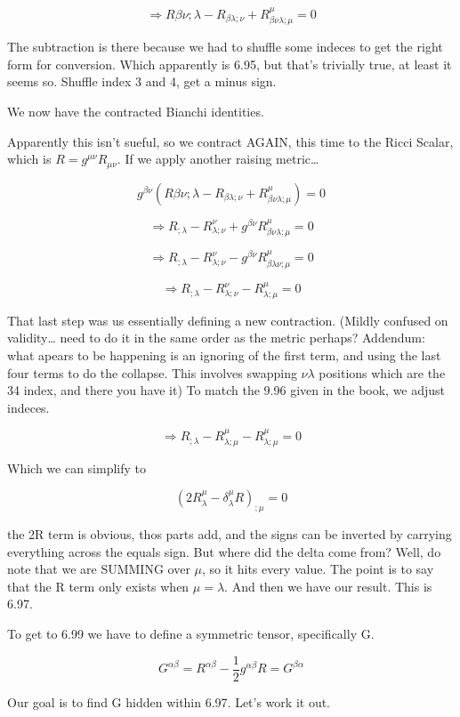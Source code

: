 \documentclass[landscape,letterpaper,10pt,english]{article}
\begin{document}
\[\Rightarrow R{\beta\nu;\lambda} - R_{\beta\lambda;\nu} + R^\mu_{\beta\nu\lambda;\mu} = 0\]

The subtraction is there because we had to shuffle some indeces to get
the right form for conversion. Which apparently is 6.95, but that's
trivially true, at least it seems so. Shuffle index 3 and 4, get a minus
sign.

We now have the contracted Bianchi identities.

Apparently this isn't sueful, so we contract AGAIN, this time to the
Ricci Scalar, which is \(R = g^{\mu\nu}R_{\mu\nu}\). If we apply another
raising metric\ldots{}

\[g^{\beta\nu} (R{\beta\nu;\lambda} - R_{\beta\lambda;\nu} + R^\mu_{\beta\nu\lambda;\mu}) = 0\]

\[\Rightarrow R_{;\lambda} - R^\nu_{\lambda;\nu} + g^{\beta\nu}R^\mu_{\beta\nu\lambda;\mu} = 0\]

\[\Rightarrow R_{;\lambda} - R^\nu_{\lambda;\nu} - g^{\beta\nu}R^\mu_{\beta\lambda\nu;\mu} = 0\]

\[\Rightarrow R_{;\lambda} - R^\nu_{\lambda;\nu} - R^{\mu}_{\lambda;\mu} = 0\]

That last step was us essentially defining a new contraction. (Mildly
confused on validity\ldots{} need to do it in the same order as the
metric perhaps? Addendum: what apears to be happening is an ignoring of
the first term, and using the last four terms to do the collapse. This
involves swapping \(\nu\lambda\) positions which are the 34 index, and
there you have it) To match the 9.96 given in the book, we adjust
indeces.

\[\Rightarrow R_{;\lambda} - R^\mu_{\lambda;\mu} - R^{\mu}_{\lambda;\mu} = 0\]

    Which we can simplify to

\[ (2R^\mu_\lambda - \delta^\mu_\lambda R)_{;\mu} = 0\]

the 2R term is obvious, thos parts add, and the signs can be inverted by
carrying everything across the equals sign. But where did the delta come
from? Well, do note that we are SUMMING over \(\mu\), so it hits every
value. The point is to say that the R term only exists when
\(\mu = \lambda\). And then we have our result. This is 6.97.

To get to 6.99 we have to define a symmetric tensor, specifically G.

\[ G^{\alpha\beta} = R^{\alpha\beta} - \frac12 g^{\alpha\beta}R = G^{\beta\alpha} \]

Our goal is to find G hidden within 6.97. Let's work it out.
\end{document}

